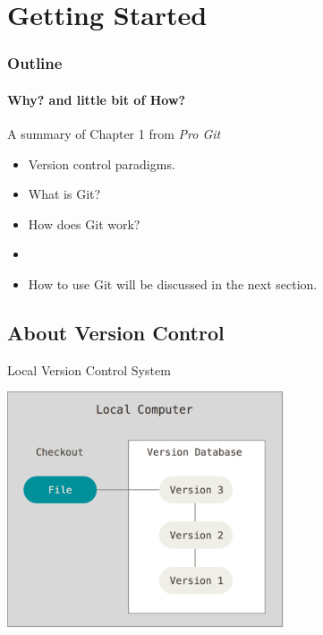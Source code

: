 \section{Getting Started}
\begin{frame}[t]
  \frametitle{Outline}
  \framesubtitle{Why? and little bit of How?}
\end{frame}

\begin{frame}[t]{A summary of Chapter 1 from {\it Pro Git}}
  \begin{itemize}
    \item Version control paradigms.
    \item What is Git?
    \item How does Git work?
    \item[]
    \item How to use Git will be discussed in the next section.
  \end{itemize}
\end{frame}

\subsection{About Version Control}
\begin{frame}[t]{Local Version Control System}
  \begin{center}
    \includegraphics[height=2.75in]{./images/02-getting-started/local}
  \end{center}
\end{frame}

